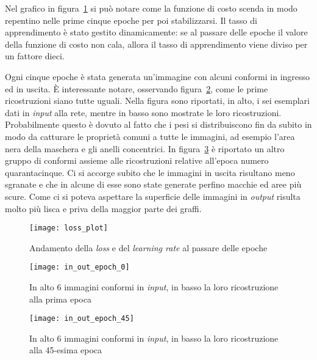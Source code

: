 Nel grafico in figura~\ref{fig:loss_plot} si può notare come la funzione di costo scenda in modo repentino nelle prime cinque epoche per poi stabilizzarsi.
Il tasso di apprendimento è stato gestito dinamicamente: se al passare delle epoche il valore della funzione di costo non cala, allora il tasso di apprendimento viene diviso per un fattore dieci.

Ogni cinque epoche è stata generata un'immagine con alcuni conformi in ingresso  ed in uscita.
È interessante notare, osservando figura~\ref{fig:epoch_0}, come le prime ricostruzioni siano tutte uguali.
Nella figura sono riportati, in alto, i sei esemplari dati in \textit{input} alla rete, mentre in basso sono mostrate le loro ricostruzioni.
Probabilmente questo è dovuto al fatto che i pesi si distribuiscono fin da subito in modo da catturare le proprietà comuni a tutte le immagini, ad esempio l'area nera della maschera e gli anelli concentrici.
In figura~\ref{fig:epoch_45} è riportato un altro gruppo di conformi assieme alle ricostruzioni relative all'epoca numero quarantacinque.
Ci si accorge subito che le immagini in uscita risultano meno sgranate e che in alcune di esse sono state generate perfino macchie ed aree più scure.
Come ci si poteva aspettare la superficie delle immagini in \textit{output} risulta molto più lisca e priva della maggior parte dei graffi.

\begin{figure}[ht] %
  \begin{center}
    \texttt{[image: loss\_plot]}
    \caption{Andamento della \textit{loss} e del \textit{learning rate} al passare delle epoche}
    \label{fig:loss_plot}
  \end{center}
\end{figure}

\begin{figure}[ht] %
  \begin{center}
    \texttt{[image: in\_out\_epoch\_0]}
    \caption{In alto 6 immagini conformi in \textit{input}, in basso la loro ricostruzione alla prima epoca}
    \label{fig:epoch_0}
  \end{center}
\end{figure}

\begin{figure}[ht] %
  \begin{center}
    \texttt{[image: in\_out\_epoch\_45]}
    \caption{In alto 6 immagini conformi in \textit{input}, in basso la loro ricostruzione alla 45-esima epoca}
    \label{fig:epoch_45}
  \end{center}
\end{figure}

